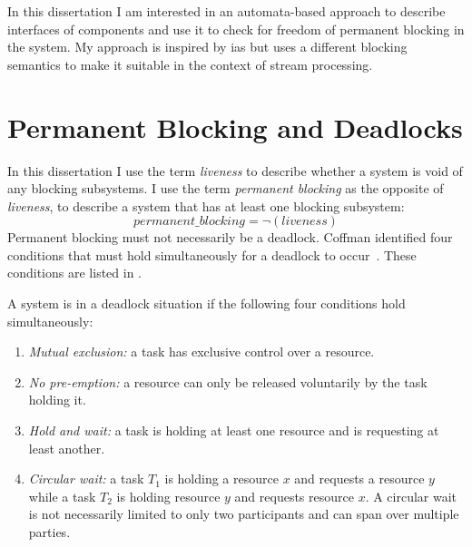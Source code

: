 In this dissertation I am interested in an automata-based approach to describe interfaces of components and use it to check for freedom of permanent blocking in the system.
My approach is inspired by \glspl{ia} but uses a different blocking semantics to make it suitable in the context of stream processing.


\section{Permanent Blocking and Deadlocks}
\label{sect_background_block}

In this dissertation I use the term \emph{liveness} to describe whether a system is void of any blocking subsystems.
I use the term \emph{permanent blocking} as the opposite of \emph{liveness}, \ie to describe a system that has at least one blocking subsystem:
\begin{equation}
    \label{eq_liveness}
    permanent\_blocking = \neg (liveness)
\end{equation}
Permanent blocking must not necessarily be a deadlock.
Coffman \etal identified four conditions that must hold simultaneously for a deadlock to occur~\cite{coffman1971}.
These conditions are listed in \Def{\ref{def_dl}}.

\begin{definition}
    \label{def_dl}
    A system is in a deadlock situation if the following four conditions hold simultaneously:
    \begin{enumerate}
        \item \emph{Mutual exclusion:} a task has exclusive control over a resource.\label{enum_mutex}
        \item \emph{No pre-emption:} a resource can only be released voluntarily by the task holding it.\label{enum_preemption}
        \item \emph{Hold and wait:} a task is holding at least one resource and is requesting at least another.\label{enum_hold_wait}
        \item \emph{Circular wait:} a task $T_1$ is holding a resource $x$ and requests a resource $y$ while a task $T_2$ is holding resource $y$ and requests resource $x$.
            A circular wait is not necessarily limited to only two participants and can span over multiple parties.\label{enum_circular}
    \end{enumerate}
\end{definition}

